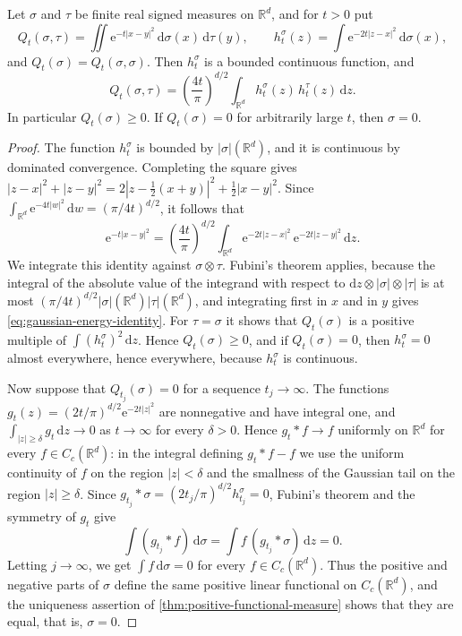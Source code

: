 \begin{lemma}\label{lem:gaussian-energy}
Let $\sigma$ and $\tau$ be finite real signed measures on $\mathbb R^d$, and for $t>0$ put
\[
 Q_t(\sigma,\tau)=\iint\mathrm e^{-t|x-y|^2}\,\mathrm d\sigma(x)\,\mathrm d\tau(y),\qquad h_t^\sigma(z)=\int\mathrm e^{-2t|z-x|^2}\,\mathrm d\sigma(x),
\]
and $Q_t(\sigma)=Q_t(\sigma,\sigma)$. Then $h_t^\sigma$ is a bounded continuous function, and
\begin{equation}\label{eq:gaussian-energy-identity}
 Q_t(\sigma,\tau)=\left(\frac{4t}{\pi}\right)^{d/2}\int_{\mathbb R^d}h_t^\sigma(z)\,h_t^\tau(z)\,\mathrm d z.
\end{equation}
In particular $Q_t(\sigma)\geq0$. If $Q_t(\sigma)=0$ for arbitrarily large $t$, then $\sigma=0$.
\end{lemma}
\begin{proof}
The function $h_t^\sigma$ is bounded by $|\sigma|(\mathbb R^d)$, and it is continuous by dominated convergence. Completing the square gives $|z-x|^2+|z-y|^2=2|z-\tfrac12(x+y)|^2+\tfrac12|x-y|^2$. Since $\int_{\mathbb R^d}\mathrm e^{-4t|w|^2}\,\mathrm dw=(\pi/4t)^{d/2}$, it follows that
\[
 \mathrm e^{-t|x-y|^2}=\left(\frac{4t}{\pi}\right)^{d/2}\int_{\mathbb R^d}\mathrm e^{-2t|z-x|^2}\,\mathrm e^{-2t|z-y|^2}\,\mathrm d z.
\]
We integrate this identity against $\sigma\otimes\tau$. Fubini's theorem applies, because the integral of the absolute value of the integrand with respect to $\mathrm dz\otimes|\sigma|\otimes|\tau|$ is at most $(\pi/4t)^{d/2}|\sigma|(\mathbb R^d)|\tau|(\mathbb R^d)$, and integrating first in $x$ and in $y$ gives \eqref{eq:gaussian-energy-identity}. For $\tau=\sigma$ it shows that $Q_t(\sigma)$ is a positive multiple of $\int(h_t^\sigma)^2\,\mathrm dz$. Hence $Q_t(\sigma)\geq0$, and if $Q_t(\sigma)=0$, then $h_t^\sigma=0$ almost everywhere, hence everywhere, because $h_t^\sigma$ is continuous.

Now suppose that $Q_{t_j}(\sigma)=0$ for a sequence $t_j\to\infty$. The functions $g_t(z)=(2t/\pi)^{d/2}\mathrm e^{-2t|z|^2}$ are nonnegative and have integral one, and $\int_{|z|\geq\delta}g_t\,\mathrm d z\to0$ as $t\to\infty$ for every $\delta>0$. Hence $g_t*f\to f$ uniformly on $\mathbb R^d$ for every $f\in C_c(\mathbb R^d)$: in the integral defining $g_t*f-f$ we use the uniform continuity of $f$ on the region $|z|<\delta$ and the smallness of the Gaussian tail on the region $|z|\geq\delta$. Since $g_{t_j}*\sigma=(2t_j/\pi)^{d/2}h_{t_j}^\sigma=0$, Fubini's theorem and the symmetry of $g_t$ give
\[
 \int(g_{t_j}*f)\,\mathrm d\sigma=\int f\,(g_{t_j}*\sigma)\,\mathrm d z=0.
\]
Letting $j\to\infty$, we get $\int f\,\mathrm d\sigma=0$ for every $f\in C_c(\mathbb R^d)$. Thus the positive and negative parts of $\sigma$ define the same positive linear functional on $C_c(\mathbb R^d)$, and the uniqueness assertion of \cref{thm:positive-functional-measure} shows that they are equal, that is, $\sigma=0$.
\end{proof}

